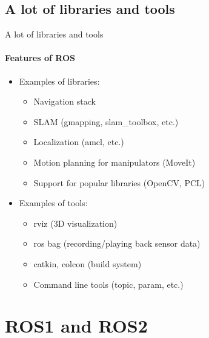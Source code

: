 \documentclass{beamer}
\begin{document}
\subsection{A lot of libraries and tools}

\begin{frame}{A lot of libraries and tools}
    \framesubtitle{Features of ROS}    
    \begin{itemize}
        \item Examples of libraries:
            \begin{itemize}
                \item Navigation stack
                \item SLAM (gmapping, slam\_toolbox, etc.)
                \item Localization (amcl, etc.)
                \item Motion planning for manipulators (MoveIt)
                \item Support for popular libraries (OpenCV, PCL)
            \end{itemize}
            
        \item Examples of tools:
            \begin{itemize}
                \item rviz (3D visualization)
                \item ros bag (recording/playing back sensor data)
                \item catkin, colcon (build system)
                \item Command line tools (topic, param, etc.)
            \end{itemize}        
    \end{itemize}
    
\end{frame}

\section{ROS1 and ROS2}
\end{document}
